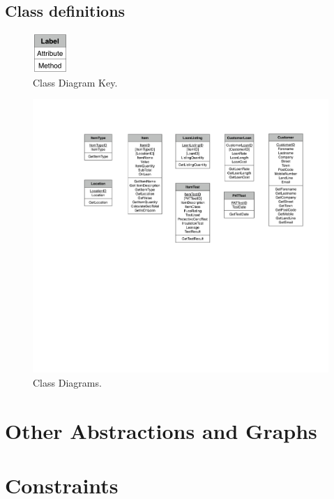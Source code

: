 \begin{landscape}

\subsection{Class definitions}

    \begin{figure}[H]
        \centerline{\includegraphics[width=50px]{./Analysis/Class_Definitions/Class_definition_key.pdf}}
        \caption{Class Diagram Key.} \label{fig:relationship_diagram}
    \end{figure}

    \begin{figure}[H]
        \centerline{\includegraphics[width=450px]{./Analysis/Class_Definitions/Class_diagrams.pdf}}
        \caption{Class Diagrams.} \label{fig:relationship_diagram}
    \end{figure}
\end{landscape}

\newpage

\section{Other Abstractions and Graphs}

\section{Constraints}

